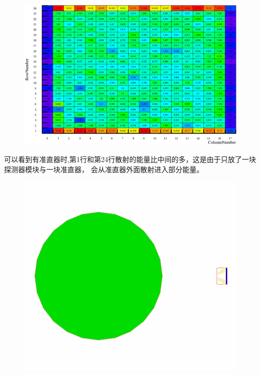 \documentclass{beamer}
\newcommand{\liuhao}{\fontsize{7.875pt}{\baselineskip}\selectfont}
\begin{document}
\begin{CJK*}{UTF8}{gkai}
\begin{frame}
\begin{minipage}[t]{0.7\textwidth}
\begin{figure}[ht]
        \includegraphics[width=\textwidth,height=0.58\textwidth]{WithCollimatorScatteringEnergyMerged.eps}
      \end{figure}
    \end{minipage}
    \begin{minipage}[t]{0.29\textwidth}
      \vskip 1cm
      \liuhao
      可以看到有准直器时,第1行和第24行散射的能量比中间的多，这是由于只放了一块探测器模块与一块准直器，
      会从准直器外面散射进入部分能量。
      \begin{figure}[ht]
	\centering
	\includegraphics[width=\textwidth]{SingleCollimator.png}
      \end{figure}
    \end{minipage}
  \end{frame}

\end{CJK*}
\end{document}
